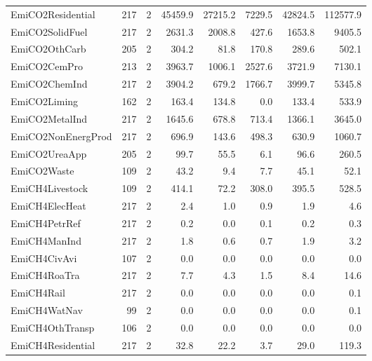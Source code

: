 {\begin{tabular}[t]{lrrrrrrr}
EmiCO2Residential & 217 & 2 & \num{45459.9} & \num{27215.2} & \num{7229.5} & \num{42824.5} & \num{112577.9}\\
EmiCO2SolidFuel & 217 & 2 & \num{2631.3} & \num{2008.8} & \num{427.6} & \num{1653.8} & \num{9405.5}\\
EmiCO2OthCarb & 205 & 2 & \num{304.2} & \num{81.8} & \num{170.8} & \num{289.6} & \num{502.1}\\
EmiCO2CemPro & 213 & 2 & \num{3963.7} & \num{1006.1} & \num{2527.6} & \num{3721.9} & \num{7130.1}\\
EmiCO2ChemInd & 217 & 2 & \num{3904.2} & \num{679.2} & \num{1766.7} & \num{3999.7} & \num{5345.8}\\
EmiCO2Liming & 162 & 2 & \num{163.4} & \num{134.8} & \num{0.0} & \num{133.4} & \num{533.9}\\
EmiCO2MetalInd & 217 & 2 & \num{1645.6} & \num{678.8} & \num{713.4} & \num{1366.1} & \num{3645.0}\\
EmiCO2NonEnergProd & 217 & 2 & \num{696.9} & \num{143.6} & \num{498.3} & \num{630.9} & \num{1060.7}\\
EmiCO2UreaApp & 205 & 2 & \num{99.7} & \num{55.5} & \num{6.1} & \num{96.6} & \num{260.5}\\
EmiCO2Waste & 109 & 2 & \num{43.2} & \num{9.4} & \num{7.7} & \num{45.1} & \num{52.1}\\
EmiCH4Livestock & 109 & 2 & \num{414.1} & \num{72.2} & \num{308.0} & \num{395.5} & \num{528.5}\\
EmiCH4ElecHeat & 217 & 2 & \num{2.4} & \num{1.0} & \num{0.9} & \num{1.9} & \num{4.6}\\
EmiCH4PetrRef & 217 & 2 & \num{0.2} & \num{0.0} & \num{0.1} & \num{0.2} & \num{0.3}\\
EmiCH4ManInd & 217 & 2 & \num{1.8} & \num{0.6} & \num{0.7} & \num{1.9} & \num{3.2}\\
EmiCH4CivAvi & 107 & 2 & \num{0.0} & \num{0.0} & \num{0.0} & \num{0.0} & \num{0.0}\\
EmiCH4RoaTra & 217 & 2 & \num{7.7} & \num{4.3} & \num{1.5} & \num{8.4} & \num{14.6}\\
EmiCH4Rail & 217 & 2 & \num{0.0} & \num{0.0} & \num{0.0} & \num{0.0} & \num{0.1}\\
EmiCH4WatNav & 99 & 2 & \num{0.0} & \num{0.0} & \num{0.0} & \num{0.0} & \num{0.1}\\
EmiCH4OthTransp & 106 & 2 & \num{0.0} & \num{0.0} & \num{0.0} & \num{0.0} & \num{0.0}\\
EmiCH4Residential & 217 & 2 & \num{32.8} & \num{22.2} & \num{3.7} & \num{29.0} & \num{119.3}\\

\end{tabular}}
